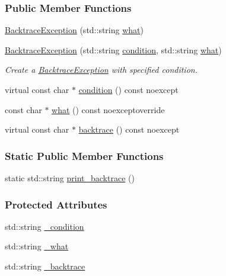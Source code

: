 \subsubsection*{Public Member Functions}
\begin{DoxyCompactItemize}
\item 
\hyperlink{classbacktrace__exception_1_1BacktraceException_acce2185f53042c593cdc55bb8f3ef289}{Backtrace\-Exception} (std\-::string \hyperlink{classbacktrace__exception_1_1BacktraceException_a865bf08728344df9ed42bb5f6aef048f}{what})
\item 
\hyperlink{classbacktrace__exception_1_1BacktraceException_ae12ee4db6c4d7ebbd1d1abf0a572642a}{Backtrace\-Exception} (std\-::string \hyperlink{classbacktrace__exception_1_1BacktraceException_accccd52bdfdbb1ffca58a695dace84f2}{condition}, std\-::string \hyperlink{classbacktrace__exception_1_1BacktraceException_a865bf08728344df9ed42bb5f6aef048f}{what})
\begin{DoxyCompactList}\small\item\em Create a \hyperlink{classbacktrace__exception_1_1BacktraceException}{Backtrace\-Exception} with specified condition. \end{DoxyCompactList}\item 
virtual const char $\ast$ \hyperlink{classbacktrace__exception_1_1BacktraceException_accccd52bdfdbb1ffca58a695dace84f2}{condition} () const noexcept
\item 
const char $\ast$ \hyperlink{classbacktrace__exception_1_1BacktraceException_a865bf08728344df9ed42bb5f6aef048f}{what} () const noexceptoverride
\item 
virtual const char $\ast$ \hyperlink{classbacktrace__exception_1_1BacktraceException_a7454505fabaa8d6ef8396049f7d4e775}{backtrace} () const noexcept
\end{DoxyCompactItemize}
\subsubsection*{Static Public Member Functions}
\begin{DoxyCompactItemize}
\item 
static std\-::string \hyperlink{classbacktrace__exception_1_1BacktraceException_aef24b0571ea422191026a2292947810a}{print\-\_\-backtrace} ()
\end{DoxyCompactItemize}
\subsubsection*{Protected Attributes}
\begin{DoxyCompactItemize}
\item 
std\-::string \hyperlink{classbacktrace__exception_1_1BacktraceException_a3e43ec7625a2390fdfad8fffd4ab126c}{\-\_\-condition}
\item 
std\-::string \hyperlink{classbacktrace__exception_1_1BacktraceException_ad935d6512b6b4a6c4ea79843391b5a1e}{\-\_\-what}
\item 
std\-::string \hyperlink{classbacktrace__exception_1_1BacktraceException_a86f9233184b7611b08faaf19b9490f43}{\-\_\-backtrace}
\end{DoxyCompactItemize}


